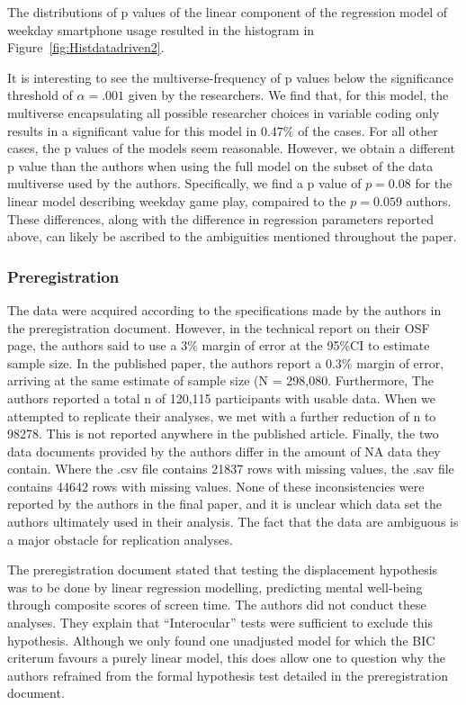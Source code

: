 \documentclass[floatsintext,man]{apa6}
\theoremstyle{definition}
\theoremstyle{definition}
\theoremstyle{definition}
\theoremstyle{remark}
\begin{document}
The distributions of p values of the linear component of the regression
model of weekday smartphone usage resulted in the histogram in
Figure~\ref{fig:Histdatadriven2}.

It is interesting to see the multiverse-frequency of p values below the
significance threshold of \(\alpha = .001\) given by the researchers. We
find that, for this model, the multiverse encapsulating all possible
researcher choices in variable coding only results in a significant
value for this model in \(0.47\%\) of the cases. For all other cases,
the p values of the models seem reasonable. However, we obtain a
different p value than the authors when using the full model on the
subset of the data multiverse used by the authors. Specifically, we find
a p value of \(p = 0.08\) for the linear model describing weekday game
play, compaired to the \(p = 0.059\) authors. These differences, along
with the difference in regression parameters reported above, can likely
be ascribed to the ambiguities mentioned throughout the paper.

\hypertarget{preregistration}{%
\subsubsection{Preregistration}\label{preregistration}}

The data were acquired according to the specifications made by the
authors in the preregistration document. However, in the technical
report on their OSF page, the authors said to use a 3\% margin of error
at the 95\%CI to estimate sample size. In the published paper, the
authors report a 0.3\% margin of error, arriving at the same estimate of
sample size (N = 298,080. Furthermore, The authors reported a total n of
120,115 participants with usable data. When we attempted to replicate
their analyses, we met with a further reduction of n to 98278. This is
not reported anywhere in the published article. Finally, the two data
documents provided by the authors differ in the amount of NA data they
contain. Where the .csv file contains 21837 rows with missing values,
the .sav file contains 44642 rows with missing values. None of these
inconsistencies were reported by the authors in the final paper, and it
is unclear which data set the authors ultimately used in their analysis.
The fact that the data are ambiguous is a major obstacle for replication
analyses.

The preregistration document stated that testing the displacement
hypothesis was to be done by linear regression modelling, predicting
mental well-being through composite scores of screen time. The authors
did not conduct these analyses. They explain that \enquote{Interocular}
tests were sufficient to exclude this hypothesis. Although we only found
one unadjusted model for which the BIC criterum favours a purely linear
model, this does allow one to question why the authors refrained from
the formal hypothesis test detailed in the preregistration document.
\end{document}
